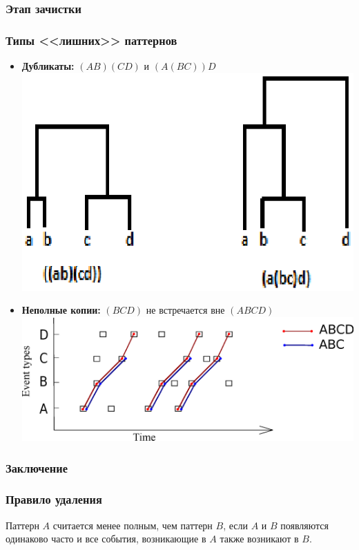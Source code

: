 \documentclass[smaller]{beamer}
\begin{document}
\subsubsection{Этап зачистки}
\begin{frame}	
  \frametitle{Типы <<лишних>> паттернов}
\begin{itemize}
 \item {\bf Дубликаты:} $(AB)(CD)$ и $(A(BC))D$
  \\ \includegraphics[scale=0.37]{dup_tree.eps} 
 \item {\bf Неполные копии:} $(BCD)$ не встречается вне $(ABCD)$
  \\ \includegraphics[scale=0.30]{dup_2.eps} 
\end{itemize}
\end{frame}

\subsubsection{Заключение}
\begin{frame}	
  \frametitle{Правило удаления}
 Паттерн $A$ считается менее полным, чем паттерн $B$, если $A$ и $B$ появляются одинаково часто и все события,
 возникающие в $A$ также возникают в $B$.
\end{frame}
\end{document}

